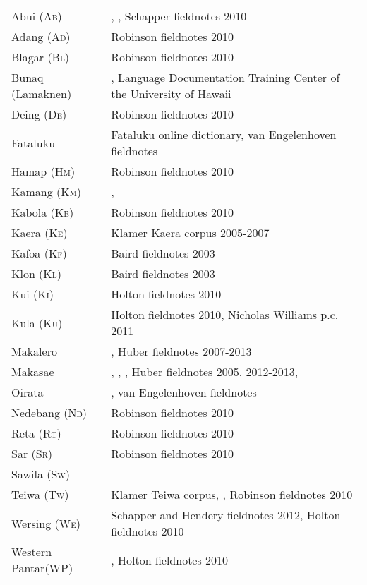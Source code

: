 \begin{tabular}{p{3.5cm}p{8cm} }

Abui (\textsc{Ab})&\citet{Kratochvil2007}, \citet{KratochvilEtAl2008}, Schapper fieldnotes 2010\\
Adang (\textsc{Ad})&Robinson fieldnotes 2010\\
Blagar (\textsc{Bl})&Robinson fieldnotes 2010\\
Bunaq (Lamaknen)&\citet{Schappernda}, \citet{Schapper2010} Language Documentation Training Center of the University of Hawaii\footnotemark{}\\
Deing (\textsc{De})&Robinson fieldnotes 2010\\
Fataluku&Fataluku online dictionary\footnotemark{}, van Engelenhoven fieldnotes\\
Hamap (H\textsc{m})&Robinson fieldnotes 2010\\
Kamang (\textsc{Km})&\citet{Schapperndb},\citet{SchapperEtAl2011kamang}\\
Kabola (\textsc{Kb})&Robinson fieldnotes 2010\\
Kaera (\textsc{Ke})&Klamer Kaera corpus 2005-2007\\
Kafoa (\textsc{Kf})&Baird fieldnotes 2003\\
Klon (\textsc{Kl})&Baird fieldnotes 2003\\
Kui (\textsc{Ki})&Holton fieldnotes 2010\\
Kula (\textsc{Ku})&Holton fieldnotes 2010, Nicholas Williams p.c. 2011\\
Makalero&\citet{Huber2011}, Huber fieldnotes 2007-2013\\
Makasae&\citet{Brotherson2003}, \citet{Carr2004}, \citet{Huber2008}, Huber fieldnotes 2005, 2012-2013, \\
Oirata&\citet{DeJong1937}, van Engelenhoven fieldnotes\\
Nedebang (\textsc{Nd})&Robinson fieldnotes 2010\\
Reta (\textsc{Rt})& Robinson fieldnotes 2010\\
Sar (\textsc{Sr})&Robinson fieldnotes 2010\\
Sawila (\textsc{Sw})&\citet{Kratochvilnd}\\
Teiwa (\textsc{Tw})&Klamer Teiwa corpus, \citet{KlamerEtAl2011}, Robinson fieldnotes 2010\\
Wersing (\textsc{We})&Schapper and Hendery fieldnotes 2012, Holton fieldnotes 2010\\
Western Pantar\newline (WP)&\citet{HoltonEtAl2008}, Holton fieldnotes 2010\\


\end{tabular}



